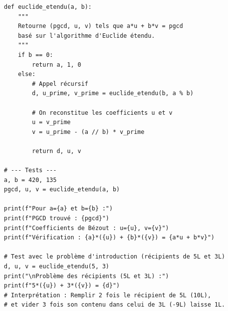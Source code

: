 \begin{verbatim}
def euclide_etendu(a, b):
    """
    Retourne (pgcd, u, v) tels que a*u + b*v = pgcd
    basé sur l'algorithme d'Euclide étendu.
    """
    if b == 0:
        return a, 1, 0
    else:
        # Appel récursif
        d, u_prime, v_prime = euclide_etendu(b, a % b)
        
        # On reconstitue les coefficients u et v
        u = v_prime
        v = u_prime - (a // b) * v_prime
        
        return d, u, v

# --- Tests ---
a, b = 420, 135
pgcd, u, v = euclide_etendu(a, b)

print(f"Pour a={a} et b={b} :")
print(f"PGCD trouvé : {pgcd}")
print(f"Coefficients de Bézout : u={u}, v={v}")
print(f"Vérification : {a}*({u}) + {b}*({v}) = {a*u + b*v}")

# Test avec le problème d'introduction (récipients de 5L et 3L)
d, u, v = euclide_etendu(5, 3)
print("\nProblème des récipients (5L et 3L) :")
print(f"5*({u}) + 3*({v}) = {d}")
# Interprétation : Remplir 2 fois le récipient de 5L (10L), 
# et vider 3 fois son contenu dans celui de 3L (-9L) laisse 1L.
\end{verbatim}